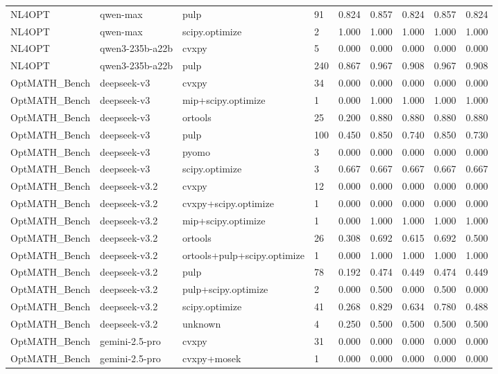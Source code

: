 \begin{table}[t]
\begin{tabular}{lllllllll}
NL4OPT & qwen-max & pulp & 91 & 0.824 & 0.857 & 0.824 & 0.857 & 0.824 \\
NL4OPT & qwen-max & scipy.optimize & 2 & 1.000 & 1.000 & 1.000 & 1.000 & 1.000 \\
NL4OPT & qwen3-235b-a22b & cvxpy & 5 & 0.000 & 0.000 & 0.000 & 0.000 & 0.000 \\
NL4OPT & qwen3-235b-a22b & pulp & 240 & 0.867 & 0.967 & 0.908 & 0.967 & 0.908 \\
OptMATH\_Bench & deepseek-v3 & cvxpy & 34 & 0.000 & 0.000 & 0.000 & 0.000 & 0.000 \\
OptMATH\_Bench & deepseek-v3 & mip+scipy.optimize & 1 & 0.000 & 1.000 & 1.000 & 1.000 & 1.000 \\
OptMATH\_Bench & deepseek-v3 & ortools & 25 & 0.200 & 0.880 & 0.880 & 0.880 & 0.880 \\
OptMATH\_Bench & deepseek-v3 & pulp & 100 & 0.450 & 0.850 & 0.740 & 0.850 & 0.730 \\
OptMATH\_Bench & deepseek-v3 & pyomo & 3 & 0.000 & 0.000 & 0.000 & 0.000 & 0.000 \\
OptMATH\_Bench & deepseek-v3 & scipy.optimize & 3 & 0.667 & 0.667 & 0.667 & 0.667 & 0.667 \\
OptMATH\_Bench & deepseek-v3.2 & cvxpy & 12 & 0.000 & 0.000 & 0.000 & 0.000 & 0.000 \\
OptMATH\_Bench & deepseek-v3.2 & cvxpy+scipy.optimize & 1 & 0.000 & 0.000 & 0.000 & 0.000 & 0.000 \\
OptMATH\_Bench & deepseek-v3.2 & mip+scipy.optimize & 1 & 0.000 & 1.000 & 1.000 & 1.000 & 1.000 \\
OptMATH\_Bench & deepseek-v3.2 & ortools & 26 & 0.308 & 0.692 & 0.615 & 0.692 & 0.500 \\
OptMATH\_Bench & deepseek-v3.2 & ortools+pulp+scipy.optimize & 1 & 0.000 & 1.000 & 1.000 & 1.000 & 1.000 \\
OptMATH\_Bench & deepseek-v3.2 & pulp & 78 & 0.192 & 0.474 & 0.449 & 0.474 & 0.449 \\
OptMATH\_Bench & deepseek-v3.2 & pulp+scipy.optimize & 2 & 0.000 & 0.500 & 0.000 & 0.500 & 0.000 \\
OptMATH\_Bench & deepseek-v3.2 & scipy.optimize & 41 & 0.268 & 0.829 & 0.634 & 0.780 & 0.488 \\
OptMATH\_Bench & deepseek-v3.2 & unknown & 4 & 0.250 & 0.500 & 0.500 & 0.500 & 0.500 \\
OptMATH\_Bench & gemini-2.5-pro & cvxpy & 31 & 0.000 & 0.000 & 0.000 & 0.000 & 0.000 \\
OptMATH\_Bench & gemini-2.5-pro & cvxpy+mosek & 1 & 0.000 & 0.000 & 0.000 & 0.000 & 0.000 \\

\end{tabular}
\end{table}
